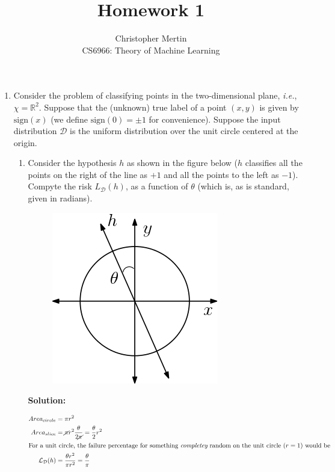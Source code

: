 \documentclass[12pt]{article}
\newcommand{\sign}[1]{\text{sign}(#1)}
\begin{document}
 
 
\title{Homework 1}%
\author{Christopher Mertin\\ %
CS6966: Theory of Machine Learning} %
 
\maketitle

\begin{enumerate}
\item Consider the problem of classifying points in the two-dimensional plane, {\em i.e.}, $\chi = \mathbb{R}^{2}$. Suppose that the (unknown) true label of a point $(x,y)$ is given by $\sign{x}$ (we define $\sign{0} = \pm 1$ for convenience). Suppose the input distribution $\mathcal{D}$ is the uniform distribution over the unit circle centered at the origin.

\begin{enumerate}
\item Consider the hypothesis $h$ as shown in the figure below ($h$ classifies all the points on the right of the line as $+1$ and all the points to the left as $-1$). Compyte the risk $L_{\mathcal{D}}(h)$, as a function of $\theta$ (which is, as is standard, given in radians). 

\begin{figure}[H]
\centering
\includegraphics[width=.25\textwidth]{hw1_fig1.png}
\end{figure}

{\bf Solution:}

\begin{align*}
Area_{circle} &= \pi r^{2}\\
Area_{slice} &= \cancel{\pi} r^{2} \frac{\theta}{2\cancel{\pi}} = \frac{\theta }{2}r^{2}\\
\intertext{For a unit circle, the failure percentage for something {\em completey} random on the unit circle $(r = 1)$ would be}
\mathcal{L}_{\mathcal{D}}(h) &= \frac{\theta r^{2}}{\pi r^{2}} = \frac{\theta}{\pi}
\end{align*}


\end{enumerate}
\end{enumerate}
\end{document}

